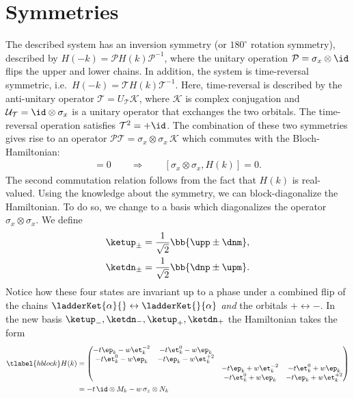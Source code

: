 \section{Symmetries}
The described system has an inversion symmetry (or $180^\circ$ rotation symmetry), described by $H(-k) = \mathcal{P} H(k) \mathcal{P}^{-1}$, where the unitary operation $\mathcal{P} = \sigma_x \otimes \id$ flips the upper and lower chains.
In addition, the system is time-reversal symmetric, i.e.~$H(-k)=\mathcal{T} H(k) \mathcal{T}^{-1}$.
Here, time-reversal is described by the anti-unitary operator $\mathcal{T}=U_\mathcal{T} \mathcal{K}$, where $\mathcal{K}$ is complex conjugation and $\mathcal{U}_\mathcal{T} = \id \otimes \sigma_x$ is a unitary operator that exchanges the two orbitals.
The time-reversal operation satisfies $\mathcal{T}^2 = +\id$.
The combination of these two symmetries gives rise to an operator $\mathcal{P}\mathcal{T} = \sigma_x \otimes \sigma_x \, \mathcal{K}$ which commutes with the Bloch-Hamiltonian:
\begin{align}
    [\mathcal{P}\mathcal{T}, H(k)] = 0\qquad \Rightarrow \qquad [\sigma_x \otimes \sigma_x, H(k)]= 0.
\end{align}
The second commutation relation follows from the fact that $H(k)$ is real-valued.
Using the knowledge about the symmetry, we can block-diagonalize the Hamiltonian. To do so, we change to a basis which diagonalizes the operator $\sigma_x \otimes \sigma_x$. We define
\begin{align}
    \ketup_\pm = \frac{1}{\sqrt{2}} \bb{ \upp \pm \dnm }, \\
    \ketdn_\pm = \frac{1}{\sqrt{2}} \bb{ \dnp \pm \upm }.
\end{align}
Notice how these four states are invariant up to a phase under a combined flip of the chains $\ladderKet{\alpha}{} \leftrightarrow \ladderKet{}{\alpha}$ \emph{and} the orbitals $+ \leftrightarrow -$.
In the new basis $\ketup_-, \ketdn_-, \ketup_+, \ketdn_+$ the Hamiltonian takes the form
\begin{align} \tlabel{hblock}
    H(k) &=
    \begin{pmatrix}
        -t\ep_k -w\et_k^{-2} & -t\et_k^0 -w\ep_k &  &  \\
        -t\et^0_k - w\ep_k & -t \ep_k - w\et_k^{+2} &  &  \\
         &  & -t\ep_k +w\et_k^{-2} & -t\et_k^0 +w\ep_k \\
         &  & -t\et^0_k + w\ep_k & -t \ep_k + w\et_k^{+2}
    \end{pmatrix} \\
    &= - t \, \id \otimes M_k - w \, \sigma_z \otimes N_k
\end{align}
